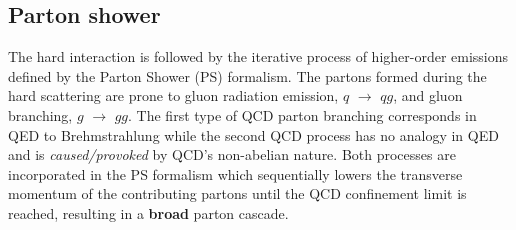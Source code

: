 \subsection{Parton shower} \label{sec::PS}

The hard interaction is followed by the iterative process of higher-order emissions defined by the Parton Shower (PS) formalism.
The partons formed during the hard scattering are prone to gluon radiation emission, $q$ $\rightarrow$ $qg$, and gluon branching, $g$ $\rightarrow$ $gg$. The first type of QCD parton branching corresponds in QED to Brehmstrahlung while the second QCD process has no analogy in QED and is \textit{caused/provoked} by QCD's non-abelian nature. Both processes are incorporated in the PS formalism which sequentially lowers the transverse momentum of the contributing partons until the QCD confinement limit is reached, resulting in a \textbf{broad} parton cascade.
\\

